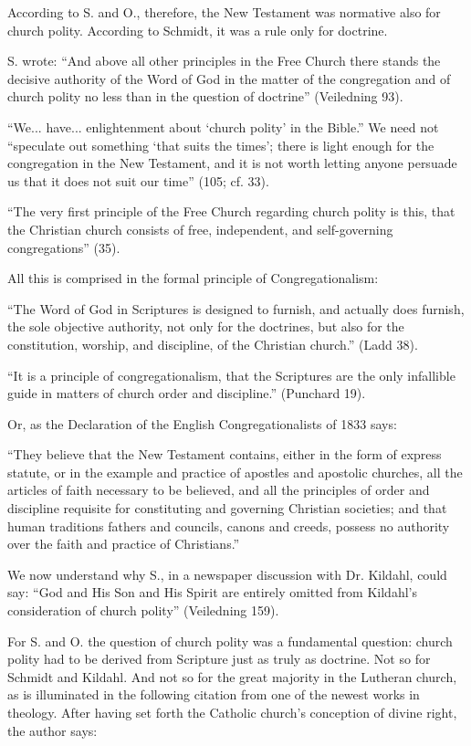 According to S. and O., therefore, the New Testament was normative also for church polity. According to Schmidt, it was a rule only for doctrine.

S. wrote: “And above all other principles in the Free Church there stands the decisive authority of the Word of God in the matter of the congregation and of church polity no less than in the question of doctrine” (Veiledning 93).

“We... have... enlightenment about ‘church polity’ in the Bible.” We need not “speculate out something ‘that suits the times’; there is light enough for the congregation in the New Testament, and it is not worth letting anyone persuade us that it does not suit our time” (105; cf. 33).

“The very first principle of the Free Church regarding church polity is this, that the Christian church consists of free, independent, and self-governing congregations” (35).

All this is comprised in the formal principle of Congregationalism:

“The Word of God in Scriptures is designed to furnish, and actually does furnish, the sole objective authority, not only for the doctrines, but also for the constitution, worship, and discipline, of the Christian church.” (Ladd 38).

“It is a principle of congregationalism, that the Scriptures are the only infallible guide in matters of church order and discipline.” (Punchard 19).

Or, as the Declaration of the English Congregationalists of 1833 says:

“They believe that the New Testament contains, either in the form of express statute, or in the example and practice of apostles and apostolic churches, all the articles of faith necessary to be believed, and all the principles of order and discipline requisite for constituting and governing Christian societies; and that human traditions fathers and councils, canons and creeds, possess no authority over the faith and practice of Christians.”

We now understand why S., in a newspaper discussion with Dr. Kildahl, could say: “God and His Son and His Spirit are entirely omitted from Kildahl’s consideration of church polity” (Veiledning 159).

For S. and O. the question of church polity was a fundamental question: church polity had to be derived from Scripture just as truly as doctrine. Not so for Schmidt and Kildahl. And not so for the great majority in the Lutheran church, as is illuminated in the following citation from one of the newest works in theology. After having set forth the Catholic church’s conception of divine right, the author says:

